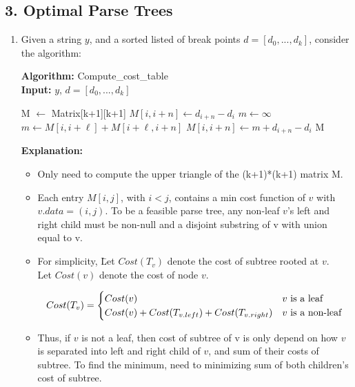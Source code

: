 \documentclass[10pt]{article}
\begin{document}
\subsection*{3. Optimal Parse Trees}
\begin{enumerate}[label=(\alph*)]
	\item Given a string $y$, and a sorted listed of break points $d=[d_0, ...,
    d_k]$, consider the algorithm:\\  
    \begin{algorithm}
      \textbf{Algorithm:} Compute\_cost\_table\\
      \textbf{Input:} $y$, $d=[d_0, ..., d_k]$\\
      \begin{algorithmic}[1]
        \State M $\gets$ Matrix[k+1][k+1] 
              \State $M[i,i+n] \gets d_{i+n} -d_i$
            \Else
              \State $m \gets \infty$
                  \State $m \gets M[i,i+\ell] + M[i+\ell, i+n]$
                \EndIf
              \EndFor
              \State $M[i, i+n] \gets m+d_{i+n}- d_i$
            \EndIf
          \EndFor
        \EndFor
        \State \Return M
      \end{algorithmic}
      \textbf{Explanation:}
      \begin{itemize}
      	\item Only need to compute the upper triangle of the (k+1)*(k+1) matrix M.
        \item Each entry $M[i,j]$, with $i<j$, contains a min cost function of
          $v$ with $v.data=(i,j)$. To be a feasible parse tree, any non-leaf
          $v$'s left and right child must be non-null and a disjoint substring
          of v with union equal to v. 
        \item 
          \begin{tabbing}
            For simplicity, \=Let $Cost(T_v)$ denote the cost of subtree rooted
              at $v$.\\
            \> Let $Cost(v)$ denote the cost of node $v$.\\
          \end{tabbing}
          \[Cost(T_v)=\begin{cases}
            Cost(v)& v \textnormal{ is a leaf}\\
            Cost(v) + Cost(T_{v.left})  + Cost(T_{v.right}) & v \textnormal{ is
              a non-leaf}\\ 
          \end{cases}\]
        \item Thus, if $v$ is not a leaf, then cost of subtree of v is only
          depend on how $v$ is separated into left and right child of $v$, and
          sum of their costs of subtree. To find the minimum, need to minimizing
          sum of both children's cost of subtree. 
                

\end{itemize}
\end{algorithm}
\end{enumerate}
\end{document}

